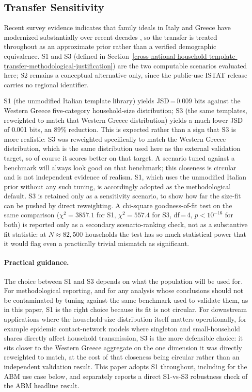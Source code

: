 \documentclass{article}
\begin{document}
\subsection{Transfer Sensitivity}\label{transfer-sensitivity}

Recent survey evidence indicates that family ideals in Italy and Greece have modernized substantially over recent decades \citep{Aassve2025}, so the transfer is treated throughout as an approximate prior rather than a verified demographic equivalence. S1 and S3 (defined in Section~\ref{cross-national-household-template-transfer-methodological-justification}) are the two computable scenarios evaluated here; S2 remains a conceptual alternative only, since the public-use ISTAT release carries no regional identifier.

S1 (the unmodified Italian template library) yields JSD\,=\,0.009 bits against the Western Greece five-category household-size distribution; S3 (the same templates, reweighted to match that Western Greece distribution) yields a much lower JSD of 0.001 bits, an 89\% reduction. This is expected rather than a sign that S3 is more realistic: S3 was reweighted specifically to match the Western Greece distribution, which is the same distribution used here as the external validation target, so of course it scores better on that target. A scenario tuned against a benchmark will always look good on that benchmark; this closeness is circular and is not independent evidence of realism. S1, which uses the unmodified Italian prior without any such tuning, is accordingly adopted as the methodological default. S3 is retained only as a sensitivity scenario, to show how far the size-fit can be pushed by direct reweighting. A chi-square goodness-of-fit test on the same comparison ($\chi^2 = 3857.1$ for S1, $\chi^2 = 557.4$ for S3, df\,=\,4, $p < 10^{-16}$ for both) is reported only as a secondary scenario-ranking check, not as a substantive fit statistic: at $N \approx 82{,}500$ households the test has so much statistical power that it would flag even a practically trivial mismatch as significant.

\paragraph{Practical guidance.} The choice between S1 and S3 depends on what the population will be used for. For methodological reporting, and for any analysis whose conclusions should not be contaminated by tuning against the same benchmark used to validate them, as in this paper, S1 is the right choice because its fit is not circular. For downstream applications where the household-size distribution itself matters operationally, for example epidemic contact-network models where singleton and small-household shares directly affect household transmission, S3 is the more defensible choice: it sits closer to the Western Greece aggregate on the one dimension it was directly reweighted to match, at the cost of that closeness being circular rather than an independent validation result. This paper adopts S1 throughout, including for the ABM use case below, and separately reports a direct S1-vs-S3 robustness check of the ABM headline result.
\end{document}
